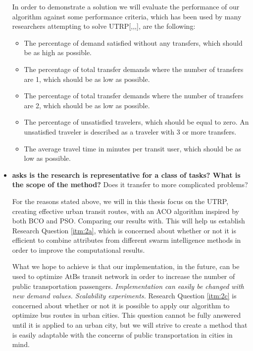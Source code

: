 \begin{itemize}
 In order to demonstrate a solution\citep{cohen88} we will evaluate the performance of our algorithm against some performance criteria, which has been used by many researchers attempting to solve UTRP[\citep{kechagiopoulos14},\citep{mandl80},\citep{nikolic14},\citep{fan09}], are the following:
\begin{itemize}
\item The percentage of demand satisfied without any transfers, which should be as high as possible.
\item The percentage of total transfer demands where the number of transfers are 1, which should be as low as possible.
\item The percentage of total transfer demands where the number of transfers are 2, which should be as low as possible.
\item The percentage of unsatisfied travelers, which should be equal to zero. An unsatisfied traveler is described as a traveler with 3 or more transfers.
\item The average travel time in minutes per transit user, which should be as low as possible. %
\end{itemize}

\item \citet{cohen88} \textbf{asks is the research is representative for a class of tasks? What is the scope of the method?}
Does it transfer to more complicated problems?

For the reasons stated above, we will in this thesis focus on the UTRP, creating effective urban transit routes, with an ACO algorithm inspired by both BCO and PSO. Comparing our results with. This will help us establish Research Question \vref{itm:2a}, which is concerned about whether or not it is efficient to combine attributes from different swarm intelligence methods in order to improve the computational results.

What we hope to achieve is that our implementation, in the future, can be used to optimize AtBs transit network in order to increase the number of public transportation passengers. \textit{Implementation can easily be changed with new demand values. Scalability experiments.} Research Question \vref{itm:2c} is concerned about whether or not it is possible to apply our algorithm to optimize bus routes in urban cities. This question cannot be fully answered until it is applied to an urban city, but we will strive to create a method that is easily adaptable with the concerns of public transportation in cities in mind.
\end{itemize}

